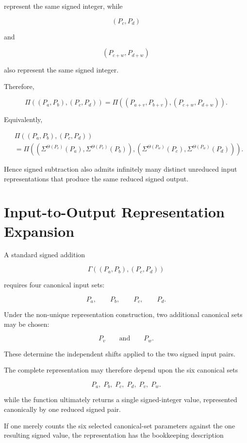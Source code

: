 \documentclass[12pt]{article}
\begin{document}
represent the same signed integer, while

\[
(P_c,P_d)
\]

and

\[
(P_{c+w},P_{d+w})
\]

also represent the same signed integer.

Therefore,

\[
\boxed{
\Pi
\left(
(P_a,P_b),(P_c,P_d)
\right)
=
\Pi
\left(
(P_{a+v},P_{b+v}),
(P_{c+w},P_{d+w})
\right).
}
\]

Equivalently,

\[
\boxed{
\begin{aligned}
&
\Pi
\left(
(P_a,P_b),(P_c,P_d)
\right)
\\[4pt]
&=
\Pi
\left(
\left(
\Sigma^{\Theta(P_v)}(P_a),
\Sigma^{\Theta(P_v)}(P_b)
\right),
\left(
\Sigma^{\Theta(P_w)}(P_c),
\Sigma^{\Theta(P_w)}(P_d)
\right)
\right).
\end{aligned}
}
\]

Hence signed subtraction also admits infinitely many distinct unreduced input representations that produce the same reduced signed output.

\section*{Input-to-Output Representation Expansion}

A standard signed addition

\[
\Gamma
\left(
(P_a,P_b),(P_c,P_d)
\right)
\]

requires four canonical input sets:

\[
P_a,\qquad P_b,\qquad P_c,\qquad P_d.
\]

Under the non-unique representation construction, two additional canonical sets may be chosen:

\[
P_v
\qquad\text{and}\qquad
P_w.
\]

These determine the independent shifts applied to the two signed input pairs.

The complete representation may therefore depend upon the six canonical sets

\[
\boxed{
P_a,\;
P_b,\;
P_c,\;
P_d,\;
P_v,\;
P_w.
}
\]

while the function ultimately returns a single signed-integer value, represented canonically by one reduced signed pair.

If one merely counts the six selected canonical-set parameters against the one resulting signed value, the representation has the bookkeeping description
\end{document}

